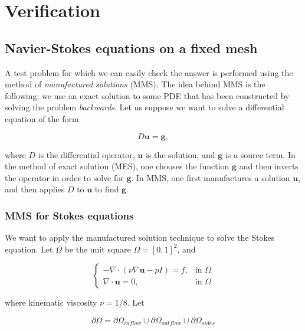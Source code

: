 \documentclass[a4paper,11pt,openright,twoside]{book}
\begin{document}
\chapter{Verification}

\section{Navier-Stokes equations on a fixed mesh}


A test problem for which we can easily check the answer is performed using the method of \textit{manufactured solutions} (MMS). The idea behind MMS is the following: we use an exact solution to some PDE that has been constructed by solving the problem \textit{backwards}. Let us suppose we want to solve a differential equation of the form

\[
D \mathbf{u} = \mathbf{g},
\]

where $D$ is the differential operator, $\mathbf{u}$ is the solution, and $\mathbf{g}$ is a source term. In the method of exact solution (MES), one chooses the function $\mathbf{g}$ and then inverts the operator in order to solve for $\mathbf{g}$. In MMS, one first manufactures a solution $\mathbf{u}$, and then applies $D$ to $\mathbf{u}$ to find $\mathbf{g}$. \\




\subsection{MMS for Stokes equations}

We want to apply the manufactured solution technique to solve the Stokes equation. Let $\Omega$ be the unit square $\Omega = [0,1]^2$, and

\vspace{0.2cm}
\[
\begin{cases}
- \nabla \cdot (\nu \nabla \mathbf{u} - pI) = f, & \mbox{in } \Omega \\
\nabla \cdot \mathbf{u} = 0, & \mbox{in } \Omega
\end{cases}
\]
\vspace{0.2cm}

where kinematic viscosity $\nu = 1/8$. Let

\[
\partial \Omega = \partial \Omega_{inflow} \cup \partial \Omega_{outflow} \cup \partial \Omega_{sides}
\]
\end{document}
